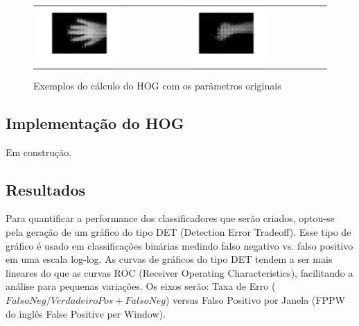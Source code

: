 \begin{figure}[H]
	\centering
	\begin{tabular}{p{} p{}}
		\vspace{1pt} \includegraphics[width=0.6\textwidth]{image/hog/0_01.png} &
		\vspace{0pt} \includegraphics[width=0.6\textwidth]{image/hog/7_01.png}
	\end{tabular}	
  	\caption{Exemplos do cálculo do HOG com os parâmetros originais}
  	\label{fig:hog_example1}
\end{figure}

\subsection{Implementação do HOG}

Em construção.

\subsection{Resultados}

Para quantificar a performance dos classificadores que serão criados, optou-se pela geração de um gráfico do tipo DET (Detection Error Tradeoff). Esse tipo de gráfico é usado em classificações binárias medindo falso negativo vs. falso positivo em uma escala log-log. As curvas de gráficos do tipo DET tendem a ser mais lineares do que as curvas ROC (Receiver Operating Characteristics), facilitando a análise para pequenas variações. Os eixos serão: Taxa de Erro (\(FalsoNeg/VerdadeiroPos + FalsoNeg\)) versus Falso Positivo por Janela (FPPW do inglês False Positive per Window).


